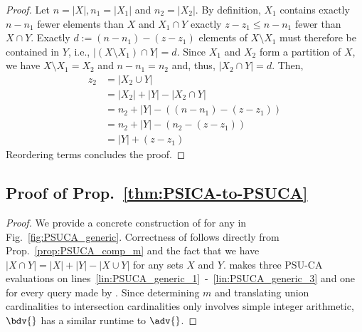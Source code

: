 \begin{proof}
  Let $n = |X|, n_1 = |X_1|$ and $n_2 = |X_2|$.  By definition, $X_1$ contains
  exactly $n - n_1$ fewer elements than $X$ and $X_1 \cap Y$ exactly
  $z-z_1 \leq n - n_1$ fewer than $X \cap Y$.  Exactly
  $d := (n - n_1) - (z - z_1)$ elements of $X \setminus X_1$ must therefore be
  contained in $Y$, i.e., $|(X\setminus X_1) \cap Y| = d$.  Since $X_1$ and
  $X_2$ form a partition of $X$, we have $X\setminus X_1 = X_2$ and
  $n-n_1 = n_2$ and, thus, $|X_2 \cap Y| = d$. Then,
  \begin{equation*}
    \begin{split}
      z_2 & = |X_2 \cup Y| \\
          & = |X_2| + |Y| - |X_2 \cap Y| \\
          & = n_2 + |Y| - ((n-n_1) - (z - z_1)) \\
          & = n_2 + |Y| - (n_2 - (z - z_1)) \\
          & = |Y| + (z - z_1)
    \end{split}
  \end{equation*}
  Reordering terms concludes the proof.
\end{proof}

\subsection{Proof of Prop.~\ref{thm:PSICA-to-PSUCA}}\label{proof:PSICA-to-PSUCA}


\begin{proof}
  We provide a concrete construction of \bdv{} for any \adv{} in Fig.~\ref{fig:PSUCA_generic}.
  Correctness of \bdv{} follows directly from
  Prop.~\ref{prop:PSUCA_comp_m} and the fact that 
  we have $|X\cap Y| = |X| + |Y| - |X \cup Y|$ for any sets $X$ and $Y$.
  \bdv{} makes three PSU-CA evaluations on
  lines~\ref{lin:PSUCA_generic_1}~-~\ref{lin:PSUCA_generic_3} and one for every
  \PSICA{} query made by \adv{}.
  Since determining $m$ and translating union cardinalities to intersection
  cardinalities only involves simple integer arithmetic,
  $\bdv{}$ has a similar runtime to $\adv{}$.
\end{proof}

